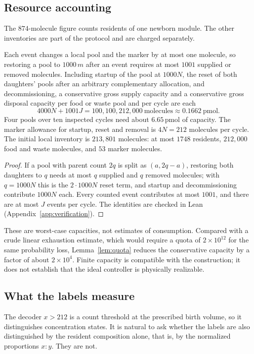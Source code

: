 \subsection{Resource accounting}\label{sec:resources}
The $874$-molecule figure counts residents of one newborn module. The other inventories are part of the protocol and are charged separately.

\begin{proposition}\label{prop:capacity}
Each event changes a local pool and the marker by at most one molecule, so restoring a pool to $1000\,m$ after an event requires at most $1001$ supplied or removed molecules. Including startup of the pool at $1000N$, the reset of both daughters' pools after an arbitrary complementary allocation, and decommissioning, a conservative gross supply capacity and a conservative gross disposal capacity per food or waste pool and per cycle are each
\begin{equation}\label{eq:capacity}
 4000N+1001J=100{,}100{,}212{,}000\ \text{molecules}\approx0.1662\ \mathrm{pmol}.
\end{equation}
Four pools over ten inspected cycles need about $6.65$\,pmol of capacity. The marker allowance for startup, reset and removal is $4N=212$ molecules per cycle. The initial local inventory is $213{,}801$ molecules: at most $1748$ residents, $212{,}000$ food and waste molecules, and $53$ marker molecules.
\end{proposition}
\begin{proof}
If a pool with parent count $2q$ is split as $(a,2q-a)$, restoring both daughters to $q$ needs at most $q$ supplied and $q$ removed molecules; with $q=1000N$ this is the $2\cdot1000N$ reset term, and startup and decommissioning contribute $1000N$ each. Every counted event contributes at most $1001$, and there are at most $J$ events per cycle. The identities are checked in Lean (Appendix~\ref{app:verification}).
\end{proof}

These are worst-case capacities, not estimates of consumption. Compared with a crude linear exhaustion estimate, which would require a quota of $2\times10^{12}$ for the same probability loss, Lemma~\ref{lem:quota} reduces the conservative capacity by a factor of about $2\times10^4$. Finite capacity is compatible with the construction; it does not establish that the ideal controller is physically realizable.

\subsection{What the labels measure}\label{sec:ratio}
The decoder $x>212$ is a count threshold at the prescribed birth volume, so it distinguishes concentration states. It is natural to ask whether the labels are also distinguished by the resident composition alone, that is, by the normalized proportions $x:y$. They are not.


